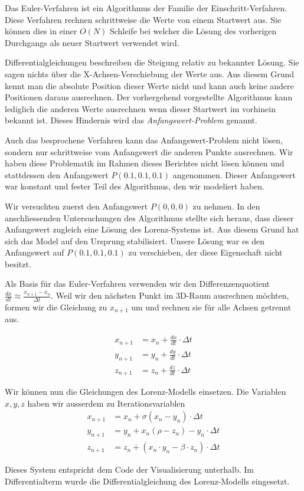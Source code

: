 Das Euler-Verfahren ist ein Algorithmus der Familie der Einschritt-Verfahren. Diese Verfahren rechnen schrittweise die Werte von einem Startwert aus. Sie können dies in einer $ O(N) $ Schleife bei welcher die Lösung des vorherigen Durchgangs als neuer Startwert verwendet wird. 

Differentialgleichungen beschreiben die Steigung relativ zu bekannter Lösung. Sie sagen nichts über die X-Achsen-Verschiebung der Werte aus. Aus diesem Grund kennt man die absolute Position dieser Werte nicht und kann auch keine andere Positionen daraus ausrechnen. Der vorhergehend vorgestellte Algorithmus kann lediglich die anderen Werte ausrechnen wenn dieser Startwert im vorhinein bekannt ist. Dieses Hindernis wird das \textit{Anfangswert-Problem} genannt.

Auch das besprochene Verfahren kann das Anfangswert-Problem nicht lösen, sondern nur schrittweise vom Anfangswert die anderen Punkte ausrechnen. Wir haben diese Problematik im Rahmen dieses Berichtes nicht lösen können und stattdessen den Anfangswert $ P(0.1, 0.1, 0.1) $ angenommen. Dieser Anfangswert war konstant und fester Teil des Algorithmus, den wir modeliert haben.

Wir versuchten zuerst den Anfangswert $ P(0, 0, 0) $ zu nehmen. In den anschliessenden Untersuchungen des Algorithmus stellte sich heraus, dass dieser Anfangswert zugleich eine Lösung des Lorenz-Systems ist. Aus diesem Grund hat sich das Model auf den Ursprung stabilisiert. Unsere Lösung war es den Anfangswert auf $ P(0.1, 0.1, 0.1) $ zu verschieben, der diese Eigenschaft nicht besitzt.

Als Basis für das Euler-Verfahren verwenden wir den Differenzenquotient $ \frac{dx}{dt} \approx \frac{x_{n + 1} - x_n}{\Delta t} $. \cite{euler1768} Weil wir den nächsten Punkt im 3D-Raum ausrechnen möchten, formen wir die Gleichung zu $ x_{n + 1} $  um und rechnen sie für alle Achsen getrennt aus.

\begin{align}
    x_{n + 1} &= x_n + \frac{dx}{dt} \cdot \Delta t\\
    y_{n + 1} &= y_n + \frac{dy}{dt} \cdot \Delta t\\
    z_{n + 1} &= z_n + \frac{dz}{dt} \cdot \Delta t
\end{align}

Wir können nun die Gleichungen des Lorenz-Modells einsetzen. Die Variablen $ x, y, z $ haben wir ausserdem zu Iterationsvariablen 
\begin{align}
    x_{n + 1} &= x_n + \sigma(x_n - y_n) \cdot \Delta t\\
    y_{n + 1} &= y_n + x_n(\rho - z_n) - y_n \cdot \Delta t\\
    z_{n + 1} &= z_n + (x_n \cdot y_n - \beta \cdot z_n) \cdot \Delta t
\end{align}

Dieses System entspricht dem Code der Visualisierung unterhalb. Im Differentialterm wurde die Differentialgleichung des Lorenz-Modells eingesetzt.
